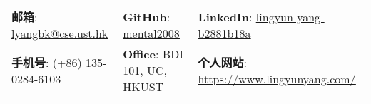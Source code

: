 \documentclass[letterpaper, 10pt]{article}
\begin{document}


\setlength{\tabcolsep}{4pt}


\vspace{0.5cm}
\begin{center}
\begin{tabular}{lll}
\textbf{邮箱}: \underline{lyangbk@cse.ust.hk} &
\hspace{0.30in} \textbf{GitHub}: \href{https://github.com/mental2008}{\underline{mental2008}} &
\hspace{0.1in} \textbf{LinkedIn}: \href{https://www.linkedin.com/in/lingyun-yang-b2881b18a/}{\underline{lingyun-yang-b2881b18a}} \\

\textbf{手机号}: (+86) 135-0284-6103 &
\hspace{0.30in} \textbf{Office}: BDI 101, UC, HKUST &
\hspace{0.1in} \textbf{个人网站}: \href{https://www.lingyunyang.com}{\underline{https://www.lingyunyang.com/}} \\
\end{tabular}
\end{center}
\end{document}
